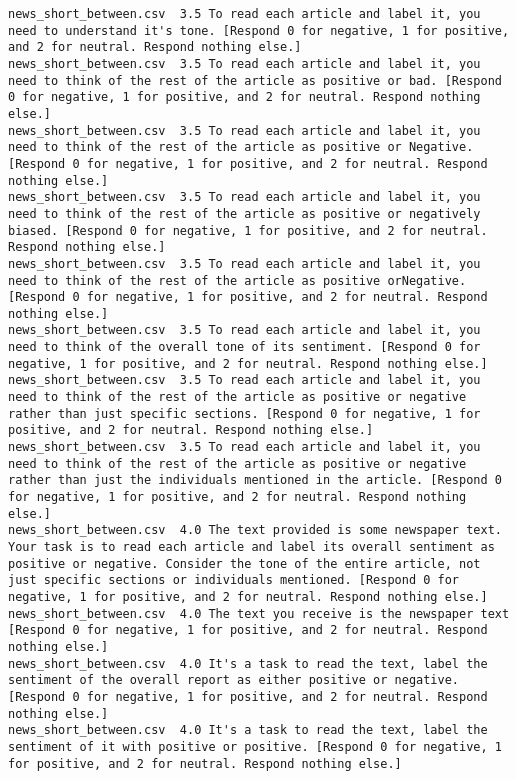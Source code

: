 \begin{lstlisting}
news_short_between.csv	3.5	To read each article and label it, you need to understand it's tone. [Respond 0 for negative, 1 for positive, and 2 for neutral. Respond nothing else.]
news_short_between.csv	3.5	To read each article and label it, you need to think of the rest of the article as positive or bad. [Respond 0 for negative, 1 for positive, and 2 for neutral. Respond nothing else.]
news_short_between.csv	3.5	To read each article and label it, you need to think of the rest of the article as positive or Negative. [Respond 0 for negative, 1 for positive, and 2 for neutral. Respond nothing else.]
news_short_between.csv	3.5	To read each article and label it, you need to think of the rest of the article as positive or negatively biased. [Respond 0 for negative, 1 for positive, and 2 for neutral. Respond nothing else.]
news_short_between.csv	3.5	To read each article and label it, you need to think of the rest of the article as positive orNegative. [Respond 0 for negative, 1 for positive, and 2 for neutral. Respond nothing else.]
news_short_between.csv	3.5	To read each article and label it, you need to think of the overall tone of its sentiment. [Respond 0 for negative, 1 for positive, and 2 for neutral. Respond nothing else.]
news_short_between.csv	3.5	To read each article and label it, you need to think of the rest of the article as positive or negative rather than just specific sections. [Respond 0 for negative, 1 for positive, and 2 for neutral. Respond nothing else.]
news_short_between.csv	3.5	To read each article and label it, you need to think of the rest of the article as positive or negative rather than just the individuals mentioned in the article. [Respond 0 for negative, 1 for positive, and 2 for neutral. Respond nothing else.]
news_short_between.csv	4.0	The text provided is some newspaper text. Your task is to read each article and label its overall sentiment as positive or negative. Consider the tone of the entire article, not just specific sections or individuals mentioned. [Respond 0 for negative, 1 for positive, and 2 for neutral. Respond nothing else.]
news_short_between.csv	4.0	The text you receive is the newspaper text [Respond 0 for negative, 1 for positive, and 2 for neutral. Respond nothing else.]
news_short_between.csv	4.0	It's a task to read the text, label the sentiment of the overall report as either positive or negative. [Respond 0 for negative, 1 for positive, and 2 for neutral. Respond nothing else.]
news_short_between.csv	4.0	It's a task to read the text, label the sentiment of it with positive or positive. [Respond 0 for negative, 1 for positive, and 2 for neutral. Respond nothing else.]

\end{lstlisting}
